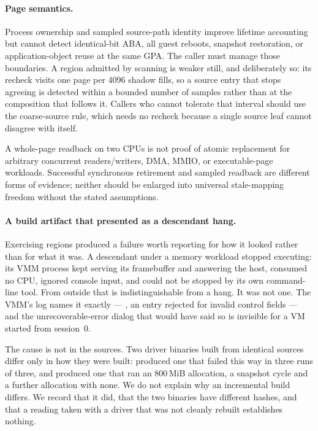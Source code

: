\paragraph{Page semantics.}
Process ownership and sampled source-path identity improve lifetime accounting
but cannot detect identical-bit ABA, all guest reboots, snapshot restoration,
or application-object reuse at the same GPA. The caller must manage those
boundaries. A region admitted by scanning is weaker still, and deliberately so:
its recheck visits one page per 4096 shadow fills, so a source entry that stops
agreeing is detected within a bounded number of samples rather than at the
composition that follows it. Callers who cannot tolerate that interval should
use the coarse-source rule, which needs no recheck because a single source leaf
cannot disagree with itself.

A whole-page readback on two CPUs is not proof of atomic replacement
for arbitrary concurrent readers/writers, DMA, MMIO, or executable-page
workloads. Successful synchronous retirement and sampled readback are different
forms of evidence; neither should be enlarged into universal stale-mapping
freedom without the stated assumptions.

\paragraph{A build artifact that presented as a descendant hang.}
Exercising regions produced a failure worth reporting for how it looked rather
than for what it was. A descendant under a memory workload stopped executing:
its VMM process kept serving its framebuffer and answering the host, consumed no
CPU, ignored console input, and could not be stopped by its own command-line
tool. From outside that is indistinguishable from a hang. It was not one. The
VMM's log names it exactly --- , an entry rejected for invalid control fields --- and the
unrecoverable-error dialog that would have said so is invisible for a VM started
from session~0.

The cause is not in the sources. Two driver binaries built from identical
sources differ only in how they were built:  produced one
that failed this way in three runs of three, and  produced one
that ran an 800\,MiB allocation, a snapshot cycle and a further allocation with
none. We do not explain why an incremental build differs. We record that it did,
that the two binaries have different hashes, and that a reading taken with a
driver that was not cleanly rebuilt establishes nothing.

